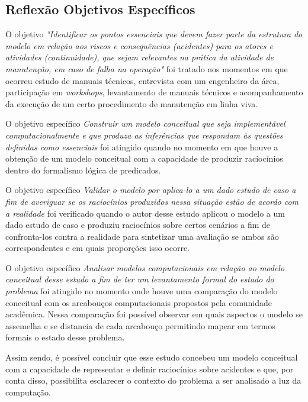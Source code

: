 \subsection{Reflexão Objetivos Específicos}\label{reflexobespecifico}


O objetivo \textit{"Identificar os pontos essenciais que devem fazer parte da estrutura do modelo em relação aos riscos e consequências (acidentes) para os atores e atividades (continuidade), que sejam relevantes na prática da atividade de manutenção, em caso de falha na operação"} foi tratado nos momentos em que ocorreu estudo de manuais técnicos, entrevista com um engenheiro da área, participação em \textit{workshops}, levantamento de manuais técnicos e acompanhamento da execução de um certo procedimento de manutenção em linha viva.  

O objetivo específico \textit{Construir um modelo conceitual que seja implementável computacionalmente e que produza as inferências que respondam às questões definidas como essenciais} foi atingido quando no momento em que houve a obtenção de um modelo conceitual com a capacidade de produzir raciocínios dentro do formalismo lógica de predicados. 

O objetivo específico \textit{Validar o modelo por aplica-lo a um dado estudo de caso a fim de averiguar se os raciocínios produzidos nessa situação estão de acordo com a realidade} foi verificado quando o autor desse estudo aplicou o modelo a um dado estudo de caso e produziu raciocínios sobre certos cenários a fim de confronta-los contra a realidade para sintetizar uma avaliação se ambos são correspondentes e em quais proporções isso ocorre. 

O objetivo específico \textit{Analisar modelos computacionais em relação ao modelo conceitual desse estudo a fim de ter um levantamento formal do estado do problema} foi atingido no momento onde houve uma comparação do modelo conceitual com os arcabouços computacionais propostos pela comunidade acadêmica. Nessa comparação foi possível observar em quais aspectos o modelo se assemelha e se distancia de cada arcabouço permitindo mapear em termos formais o estado desse problema. 

Assim sendo, é possível concluir que esse estudo concebeu um modelo conceitual com a capacidade de representar e definir raciocínios sobre acidentes e que, por conta disso, possibilita esclarecer o contexto do problema a ser analisado a luz da computação. 